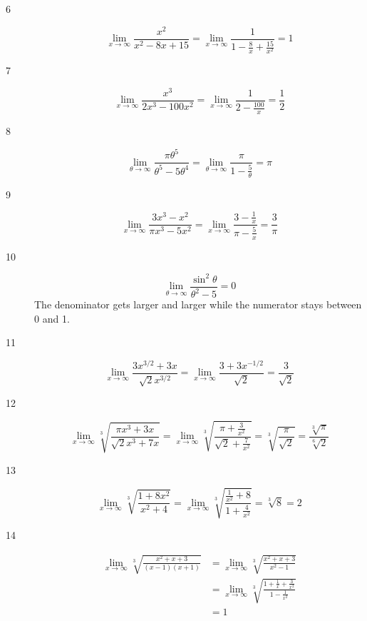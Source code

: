 \documentclass[fleqn]{exam}
\begin{document}
\begin{description}

\item[6]
\[
  \lim_{x \to \infty} \frac{x^2}{x^2 - 8x + 15} = \lim_{x \to \infty} \frac{1}{1 - \frac{8}{x} + \frac{15}{x^2}} = 1
\]

\item[7]
\[
  \lim_{x \to \infty} \frac{x^3}{2x^3 - 100x^2} = \lim_{x \to \infty} \frac{1}{2 - \frac{100}{x}} = \frac{1}{2} 
\]

\item[8]
\[
  \lim_{\theta \to \infty} \frac{\pi \theta^5}{\theta^5 - 5 \theta^4} =   \lim_{\theta \to \infty} \frac{\pi}{1 - \frac{5}{\theta}} = \pi
\]

\item[9]
\[
  \lim_{x \to \infty} \frac{3x^3 - x^2}{\pi x^3 - 5x^2} = \lim_{x \to \infty} \frac{3 - \frac{1}{x}}{\pi - \frac{5}{x}} = \frac{3}{\pi}
\]

\item[10]
\[
  \lim_{\theta \to \infty} \frac{\sin^2 \theta}{\theta^2 - 5} = 0
\]
The denominator gets larger and larger while the numerator stays between 0 and 1.

\item[11]
\[
  \lim_{x \to \infty} \frac{3 x^{3/2} + 3x}{\sqrt{2} x^{3/2}} = \lim_{x \to \infty} \frac{3 + 3 x^{-1/2}}{\sqrt{2}} = \frac{3}{\sqrt{2}}
\]

\item[12]
\[
  \lim_{x \to \infty} \sqrt[3]{ \frac{\pi x^3 + 3x}{\sqrt{2} x^3 + 7x} } 
  = \lim_{x \to \infty} \sqrt[3]{ \frac{\pi + \frac{3}{x^2}}{\sqrt{2} + \frac{7}{x^2}}} 
  = \sqrt[3]{ \frac{\pi}{\sqrt{2}} } 
  = \frac{\sqrt[3]{\pi}}{\sqrt[6]{2}}
\]

\item[13]
\[
  \lim_{x \to \infty} \sqrt[3]{ \frac{1 + 8x^2}{x^2 + 4} }
  = \lim_{x \to \infty} \sqrt[3]{ \frac{ \frac{1}{x^2} + 8}{1 + \frac{4}{x^2}} }
  = \sqrt[3]{8}
  = 2
\]

\item[14]
\begin{align*}
  \lim_{x \to \infty} \sqrt[3]{ \frac{x^2 + x + 3}{(x - 1)(x + 1)} } &= \lim_{x \to \infty} \sqrt[3]{ \frac{x^2 + x + 3}{x^2 - 1} } \\
  &= \lim_{x \to \infty} \sqrt[3]{ \frac{1 + \frac{1}{x} + \frac{3}{x^2}}{1 - \frac{1}{x^2}} } \\
  &= 1 \\
\end{align*}


\end{description}
\end{document}
